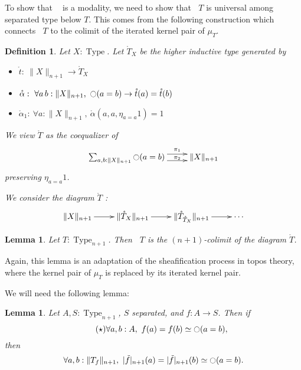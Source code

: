 \documentclass[preprint,9pt,numbers]{sigplanconf}
\makeatletter
\newtheorem{defi}[thm]{Definition}
\newtheorem{lem}[thm]{Lemma}
\def\dar[#1]#2{\ar@<-#2>[#1]\ar@<#2>[#1]} %
\DeclareMathOperator{\Type}{Type}
\newcommand{\modal}{\ensuremath{\ocircle}}
\newcommand \separated {\mathop{\square_{n+1}} }
\newenvironment{mymath}[1][-0em]{%
  \newcommand\mymathaux{\vspace{#1}}%
  \vspace{#1}%
  \begin{equation*}%
  }{ %
    \mymathaux%
  \end{equation*}}
\makeatother
\begin{document}
To show that $\separated$ is a modality, we need to show that $\separated T$
is universal among separated type below $T$. This comes from the
following construction which connects $\separated T$ to the colimit of
the iterated kernel pair of $\mu_T$.

\begin{defi}
  Let $X:\Type$. Let $\mathring T_X$ be the higher inductive type
  generated by
  \begin{itemize}
  \item $\mathring t:~\|X\|_{n+1} \to \mathring T_X$
  \item $\mathring \alpha:~\forall a\, b:\|X\|_{n+1},~\modal (a=b) \to
    \mathring t(a) = \mathring t(b)$
  \item $\mathring \alpha_1:~\forall a:\|X\|_{n+1},~
    \mathring \alpha(a , a, \eta_{a=a} 1) = 1$
  \end{itemize}

  We view $\mathring T$ as the coequalizer of
  \begin{mymath}\xymatrix{\sum_{a,b:\|X\|_{n+1}} \modal (a=b) \dar[r]{4pt}^-{\pi_1}_-{\pi_2}
  & \|X\|_{n+1}}\end{mymath}%
  preserving $\eta_{a=a} 1$.

  We consider the diagram $\mathring T$ :
  \begin{mymath}\xymatrix{\|X\|_{n+1} \ar[r] & \|\mathring T_{X}\|_{n+1} \ar[r] & \|\mathring
  T_{\mathring T_X} \|_{n+1} \ar[r] & \cdots} \end{mymath}%
\end{defi}



\begin{lem}\label{lem:sepiscolim}
  Let $T:\Type_{n+1}$. Then $\separated T$ is the $(n+1)$-colimit of the
  diagram $\mathring T$.
\end{lem}

Again, this lemma is an adaptation of the sheafification process in
topos theory, where the kernel pair of $\mu_T$
is replaced by its iterated kernel pair.

We will need the following lemma:

\begin{lem}
  Let $A,S:\Type_{n+1}$, $S$ separated, and $f:A \to S$. Then if 
  \begin{equation}
    \label{eq:Omono}\tag{$\star$}
    \forall a,b:A,~f (a) = f (b) \simeq \modal (a=b),
  \end{equation}
  then
  \begin{mymath}\forall a,b:\|T_f\|_{n+1},~|\tilde f|_{n+1} (a) = |\tilde f|_{n+1} (b) \simeq \modal (a=b).\end{mymath}%
\end{lem}
\end{document}
